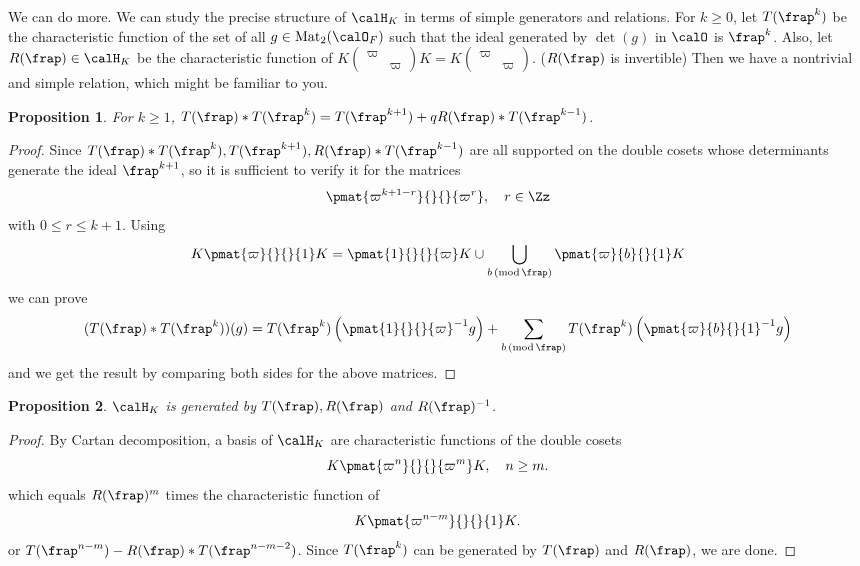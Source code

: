 \documentclass{article}
\newcommand{\Mod}[1]{\,(\mathrm{mod}\,#1)}
\newcommand{\smat}[4]{\left(\begin{smallmatrix} #1 & #2 \\ #3 & #4 \end{smallmatrix}\right)}
\newtheorem{proposition}{Proposition}[section]
\begin{document}
We can do more. We can study the precise structure of $\calH_K$ in terms of simple generators and relations. 
For $k\geq 0$, let $T(\frap^{k})$ be the characteristic function of the set of all $g\in \mathrm{Mat}_{2}(\calO_F)$ such that the ideal generated by $\det(g)$ in $\calO$ is $\frap^k$. 
Also, let $R(\frap)\in \calH_K$ be the characteristic function of $K \smat{\varpi}{}{}{\varpi} K = K\smat{\varpi}{}{}{\varpi}$. ($R(\frap)$ is invertible)
Then we have a nontrivial and simple relation, which might be familiar to you. 
\begin{proposition}
\label{heckerel}
For $k\geq 1$, $T(\frap)*T(\frap^k) = T(\frap^{k+1}) + qR(\frap)*T(\frap^{k-1})$. 
\end{proposition}
\begin{proof}
Since $T(\frap)*T(\frap^k), T(\frap^{k+1}), R(\frap)*T(\frap^{k-1})$ are all supported on the double cosets whose determinants generate the ideal $\frap^{k+1}$, so it is sufficient to verify it for the matrices 
$$
\pmat{\varpi^{k+1-r}}{}{}{\varpi^{r}}, \quad r\in \Zz
$$
with $0\leq r\leq k+1$. Using
$$
K \pmat{\varpi}{}{}{1}K = \pmat{1}{}{}{\varpi}K \cup \bigcup_{b\Mod{\frap}} \pmat{\varpi}{b}{}{1} K
$$
we can prove
$$
(T(\frap) * T(\frap^{k}))(g) = T(\frap^{k}) \left( \pmat{1}{}{}{\varpi}^{-1}g\right) + \sum_{b\Mod{\frap}} T(\frap^{k}) \left( \pmat{\varpi}{b}{}{1}^{-1} g\right)
$$
and we get the result by comparing both sides for the above matrices. 
\end{proof}
\begin{proposition}
\label{heckegen}
$\calH_K$ is generated by $T(\frap), R(\frap)$ and $R(\frap)^{-1}$. 
\end{proposition}
\begin{proof}
By Cartan decomposition, a basis of $\calH_K$ are characteristic functions of the double cosets
$$
K\pmat{\varpi^n}{}{}{\varpi^m} K, \quad n\geq m. 
$$
which equals $R(\frap)^m$ times the characteristic function of
$$
K\pmat{\varpi^{n-m}}{}{}{1} K. 
$$
or $T(\frap^{n-m}) - R(\frap)*T(\frap^{n-m-2})$. Since $T(\frap^{k})$ can be generated by $T(\frap)$ and $R(\frap)$, we are done. 
\end{proof}
\end{document}
